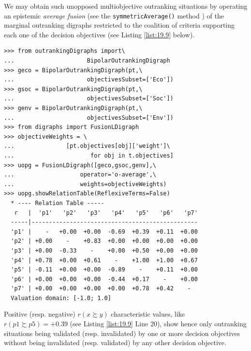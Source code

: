 We may obtain such unopposed multiobjective outranking situations by operating an epistemic \emph{average fusion} (see the \texttt{symmetricAverage()} method ) of the marginal outranking digraphs restricted to the coalition of criteria supporting each one of the decision objectives (see Listing \ref{list:19.9} below).
\begin{lstlisting}[caption={Computing unopposed outranking situations},label=list:19.9]
>>> from outrankingDigraphs import\
...                     BipolarOutrankingDigraph
>>> geco = BipolarOutrankingDigraph(pt,\
...                     objectivesSubset=['Eco'])
>>> gsoc = BipolarOutrankingDigraph(pt,\
...                     objectivesSubset=['Soc'])
>>> genv = BipolarOutrankingDigraph(pt,\
...                     objectivesSubset=['Env'])
>>> from digraphs import FusionLDigraph
>>> objectiveWeights = \
...               [pt.objectives[obj]['weight']\
...                      for obj in t.objectives] 
>>> uopg = FusionLDigraph([geco,gsoc,genv],\
...                   operator='o-average',\
...                   weights=objectiveWeights)
>>> uopg.showRelationTable(ReflexiveTerms=False)
  * ---- Relation Table -----
   r   |  'p1'   'p2'   'p3'   'p4'   'p5'   'p6'   'p7'   
  -----|------------------------------------------------
  'p1' |    -   +0.00  +0.00  -0.69  +0.39  +0.11  +0.00  
  'p2' | +0.00    -    +0.83  +0.00  +0.00  +0.00  +0.00  
  'p3' | +0.00  -0.33    -    +0.00  +0.50  +0.00  +0.00  
  'p4' | +0.78  +0.00  +0.61    -    +1.00  +1.00  +0.67  
  'p5' | -0.11  +0.00  +0.00  -0.89    -    +0.11  +0.00  
  'p6' | +0.00  +0.00  +0.00  -0.44  +0.17    -    +0.00  
  'p7' | +0.00  +0.00  +0.00  +0.00  +0.78  +0.42    -   
  Valuation domain: [-1.0; 1.0]
\end{lstlisting}
Positive (resp. negative) $r(x \succsim y)$ characteristic values, like $r(p1 \succsim p5) = +0.39$ (see Listing \ref{list:19.9} Line 20), show hence only outranking situations being validated (resp. invalidated) by one or more decision objectives without being invalidated (resp. validated) by any other decision objective.

